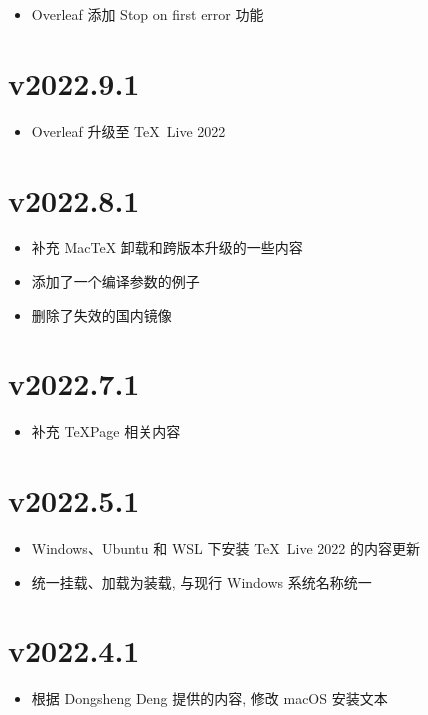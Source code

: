 \begin{itemize}
  \item Overleaf 添加 Stop on first error 功能
\end{itemize}

\section*{v2022.9.1}

\begin{itemize}
  \item Overleaf 升级至 \TeX\ Live 2022
\end{itemize}

\section*{v2022.8.1}

\begin{itemize}
  \item 补充 Mac\TeX{} 卸载和跨版本升级的一些内容
  \item 添加了一个编译参数的例子
  \item 删除了失效的国内镜像
\end{itemize}

\section*{v2022.7.1}

\begin{itemize}
  \item 补充 TeXPage 相关内容
\end{itemize}

\section*{v2022.5.1}

\begin{itemize}
  \item Windows、Ubuntu 和 WSL 下安装 \TeX\ Live 2022 的内容更新
  \item 统一挂载、加载为装载, 与现行 Windows 系统名称统一
\end{itemize}

\section*{v2022.4.1}

\begin{itemize}
  \item 根据 Dongsheng Deng 提供的内容, 修改 macOS 安装文本
\end{itemize}

